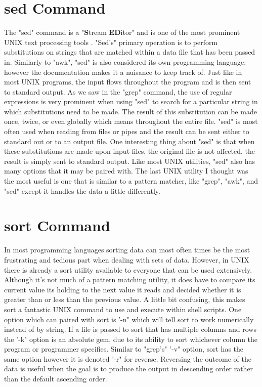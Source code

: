 \documentclass{article}
\begin{document}
\section{sed Command}
		The "sed" command is a "\textbf{S}tream \textbf{ED}itor" and is one of the most prominent UNIX text processing 
tools \cite{robbins2009unix}. "Sed's" primary operation is to perform substitutions on strings that are matched 
within a data file that has been passed in. Similarly to "awk", "sed" is also considered its own programming 
language; however the documentation makes it a nuisance to keep track of. Just like in most UNIX 
programs, the input flows throughout the program and is then sent to standard output. As we saw in the 
"grep" command, the use of regular expressions is very prominent when using "sed" to search for a 
particular string in which substitutions need to be made. The result of this substitution can be made 
once, twice, or even globally which means throughout the entire file. "sed" is most often used when 
reading from files or pipes and the result can be sent either to standard out or to an output file. One 
interesting thing about "sed" is that when these substitutions are made upon input files, the original file is 
not affected, the result is simply sent to standard output. Like most UNIX utilities, "sed" also has many 
options that it may be paired with. The last UNIX utility I thought was the most useful is one that is 
similar to a pattern matcher, like "grep", "awk", and "sed" except it handles the data a little differently.
\section{sort Command}
		In most programming languages sorting data can most often times be the most frustrating and 
tedious part when dealing with sets of data. However, in UNIX there is already a sort utility available to 
everyone that can be used extensively. Although it's not much of a pattern matching utility, it does have 
to compare its current value its holding to the next value it reads and decided whether it is greater than 
or less than the previous value. A little bit confusing, this makes sort a fantastic UNIX command to use 
and execute within shell scripts. One option which can paired with sort is '-n" which will tell sort to work 
numerically instead of by string. If a file is passed to sort that has multiple columns and rows the '-k" 
option is an absolute gem, due to its ability to sort whichever column the program or programmer 
specifies. Similar to "grep's" '-v" option, sort has the same option however it is denoted '-r" for reverse. 
Reversing the outcome of the data is useful when the goal is to produce the output in descending order 
rather than the default ascending order. 
\end{document}
